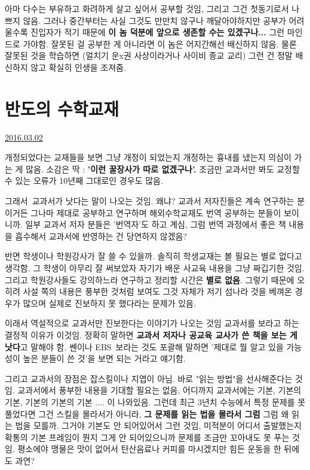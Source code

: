 아마 다수는 부유하고 화려하게 살고 싶어서 공부할 것임, 그리고 그건 첫동기로서 나쁘지 않음.
그러나 중간부터는 사실 그것도 만만치 않구나 깨달아야하지만
공부가 어려울수록 진입자가 적기 때문에 \textbf{이 놈 덕분에 앞으로 생존할 수는 있겠구나...} 그런 마인드로 가야함.
잘못된 걸 공부한 게 아니라면 이 놈은 어지간해선 배신하지 않음.
물론 잘못된 것을 학습하면 (얼치기 운x권 사상이라거나 사이비 종교 교리) 그런 건 정말 배신하지 않고 확실히 인생을 조져줌.




\section{반도의 수학교재}
\href{https://www.kockoc.com/Apoc/659705}{2016.03.02}

\vspace{5mm}

개정되었다는 교재들을 보면 그냥 개정이 되었는지 개정하는 흉내를 냈는지 의심이 가는 게 많음.
소감은 딱 : \textbf{'이런 꿀장사가 따로 없겠구나'.}
조금만 교과서만 봐도 교정할 수 있는 오류가 10년째 그대로인 경우도 많음.
\vspace{5mm}

그래서 교과서가 낫다는 말이 나오는 것임.
왜냐? 교과서 저자진들은 계속 연구하는 분이거든
그나마 제대로 공부하고 연구하며 해외수학교재도 번역 공부하는 분들이 보이니까.
일부 교과서 저자 분들은 '번역자'도 하고 계심, 그럼 번역 과정에서 좋은 책 내용을 흡수해서 교과서에 반영하는 건 당연하지 않겠음?
\vspace{5mm}

반면 학생이나 학원강사가 잘 쓸 수 있을까.
솔직히 학생교재는 볼 필요는 별로 없다고 생각함. 그 학생이 아무리 잘 써보았자 자기가 배운 사교육 내용을 그냥 짜깁기한 것임.
그리고 학원강사들도 강의하느라 연구하고 정리할 시간은 \textbf{별로 없음}.
그렇기 때문에 오히려 사설 쪽의 내용은 풍부한 것처럼 보여도 그것 자체가 저기 섬나라 것을 베껴온 경우가 많으며
실제로 진보하지 못 했다라는 문제가 있음.
\vspace{5mm}

이래서 역설적으로 교과서만 진보한다는 이야기가 나오는 것임
교과서를 보라고 하는 결정적 이유가 이것임. 정확히 말하면 \textbf{교과서 저자나 공교육 교사가 쓴 책을 보는 게 낫다}고 말해야 함.
쎈이나 EBS 보라는 것도 포괄해 말하면 '제대로 뭘 알고 있을 가능성이 높은 분들이 쓴 것'을 보면 되는 거라고 얘기함.
\vspace{5mm}

그리고 교과서의 장점은 잡스킬이나 지엽이 아님. 바로 "읽는 방법"을 선사해준다는 것임.
교과서에서 풍부한 내용을 기대할 필요는 없음, 어디까지 교과서에는 기본, 기본의 기본, 기본의 기본의 기본 .... 이 나와있음.
그런데 최근 3년치 수능에서 특정 문제를 못 풀었다면 그건 스킬을 몰라서가 아니라, \textbf{그 문제를 읽는 법을 몰라서 그럼}
그럼 왜 읽는 법을 모를까. 그거야 기본도 안 되어있어서 그런 것임,
미적분이 어디서 출발했는지 확통의 기본 프레임이 뭔지 그게 안 되어있으니까 문제를 조금만 꼬아내도 못 푸는 것임.
평소에야 맹물은 맛이 없어서 탄산음료나 커피를 마시겠지만 힘든 운동을 한 뒤에도 과연?
\vspace{5mm}

